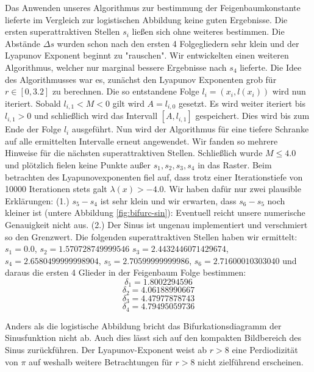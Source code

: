 \documentclass{scrartcl}
\begin{document}
Das Anwenden unseres Algorithmus zur bestimmung der Feigenbaumkonstante lieferte im Vergleich zur logistischen Abbildung keine guten Ergebnisse. Die ersten superattraktiven Stellen $s_i$ ließen sich ohne weiteres bestimmen. Die Abstände $\Delta s$ wurden schon nach den ersten 4 Folgegliedern sehr klein und der Lyapunov Exponent beginnt zu "rauschen". 
Wir entwickelten einen weiteren Algorithmus, welcher nur marginal bessere Ergebnisse nach $s_4$ lieferte. Die Idee des Algorithmusses war es, zunächst den Lyapunov Exponenten grob für $r\in [0,3.2]$ zu berechnen. 
Die so entstandene Folge $l_i=(x_i, l(x_i))$ wird nun iteriert. Sobald $l_{i,1} < M < 0$ gilt wird $A=l_{i,0}$ gesetzt. Es wird weiter iteriert bis $l_{i,1} > 0$ und schließlich wird das Intervall $[A, l_{i,1}]$ gespeichert. Dies wird bis zum Ende der Folge $l_i$ ausgeführt. 
Nun wird der Algorithmus für eine tiefere Schranke auf alle ermittelten Intervalle erneut angewendet. 
Wir fanden so mehrere Hinweise für die nächsten superattraktiven Stellen. 
Schließlich wurde $M \leq 4.0$ und plötzlich fielen keine Punkte außer $s_1, s_2, s_3, s_4$ in das Raster. Beim betrachten des Lyapunovexponenten fiel auf, dass trotz einer Iterationstiefe von 10000 Iterationen stets galt $\lambda(x)>-4.0$. 
Wir haben dafür nur zwei plausible Erklärungen: 
(1.) $s_5-s_4$ ist sehr klein und wir erwarten, dass $s_6-s_5$ noch kleiner ist (untere Abbildung \ref{fig:bifurc-sin}): Eventuell reicht unsere numerische Genauigkeit nicht aus. 
(2.) Der Sinus ist ungenau implementiert und verschmiert so den Grenzwert. 
Die folgenden superattraktiven Stellen haben wir ermittelt: $s_1=0.0$, $s_2=1.570728749999546$ $s_3=2.4432446071429674$, $s_4=2.6580499999998904$, $s_5=2.70599999999986$, $s_6=2.71600010303040$ und daraus die ersten 4 Glieder in der Feigenbaum Folge bestimmen:
$$\delta_1=1.8002294596$$
$$\delta_2=4.06188990667$$
$$\delta_3=4.47977878743$$
$$\delta_4=4.79495059736$$

Anders als die logistische Abbildung bricht das Bifurkationsdiagramm der Sinusfunktion nicht ab. Auch dies lässt sich auf den kompakten Bildbereich des Sinus zurückführen. Der Lyapunov-Exponent weist ab $r>8$ eine Perdiodizität von $\pi$ auf weshalb weitere Betrachtungen für $r>8$ nicht zielführend erscheinen.
\end{document}

